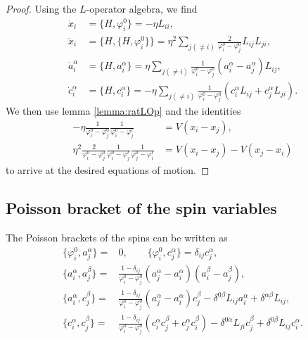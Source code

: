 \begin{proof}
    Using the $L$-operator algebra, we find
    \begin{align*}
        \dot x_i &= \{ H,\varphi_i^0 \} = -\eta L_{ii},
        \\[7pt]
        \ddot x_i
        &= \{ H, \{ H,\varphi_i^0 \} \} = \eta^2 \sum_{j(\neq i)} \frac{2}{\varphi_i^0-\varphi_j^0} L_{ij} L_{ji}, \\
        \dot a_i^\alpha
        &= \{ H,a_i^\alpha \} = \eta \sum_{j(\neq i)} \frac{1}{\varphi_i^0-\varphi_j^0} (a_i^\alpha-a_j^\alpha) L_{ij}, \\
        \dot c_i^\alpha
        &= \{ H,c_i^\alpha \} = -\eta \sum_{j(\neq i)} \frac{1}{\varphi_i^0-\varphi_j^0} (c_i^\alpha L_{ij} + c_j^\alpha L_{ji}).
    \end{align*}
    We then use lemma \ref{lemma:ratLOp} and the identities
    \begin{align*}
        -\eta \frac{1}{\varphi_i^0-\varphi_j^0} \frac{1}{\varphi_i^0 - \varphi_j^\ell} &= V(x_i-x_j), \\
        \eta^2 \frac{2}{\varphi_i^0-\varphi_j^0} \frac{1}{\varphi_i^0 - \varphi_j^\ell} \frac{1}{\varphi_j^0 - \varphi_i^\ell} &= V(x_i-x_j)-V(x_j-x_i)
    \end{align*}
    to arrive at the desired equations of motion.
\end{proof}

\subsection{Poisson bracket of the spin variables}

\begin{prop}
    The Poisson brackets of the spins can be written as
    \begin{align}
        \{ \varphi_i^0, a_j^\alpha \} ={}& 0, \qquad \{ \varphi_i^0,c_j^\alpha \} = \delta_{ij} c_j^\alpha, \\[8pt]
        \{ a_i^\alpha,a_j^\beta \} ={}& \frac{1-\delta_{ij}}{\varphi_i^0-\varphi_j^0} (a_j^\alpha-a_i^\alpha) (a_i^\beta-a_j^\beta),
        \\[4pt]
        \{ a_i^\alpha,c_j^\beta \} ={}& \frac{1-\delta_{ij}}{\varphi_i^0-\varphi_j^0} (a_j^\alpha-a_i^\alpha) c_j^\beta - \delta^{0\beta} L_{ij} a_i^\alpha + \delta^{\alpha\beta} L_{ij},
        \\[4pt]
        \{ c_i^\alpha,c_j^\beta \} ={}& \frac{1-\delta_{ij}}{\varphi_i^0-\varphi_j^0} (c_i^\alpha c_j^\beta + c_j^\alpha c_i^\beta) - \delta^{0\alpha} L_{ji} c_j^\beta + \delta^{0\beta} L_{ij} c_i^\alpha.
    \end{align}
\end{prop}

